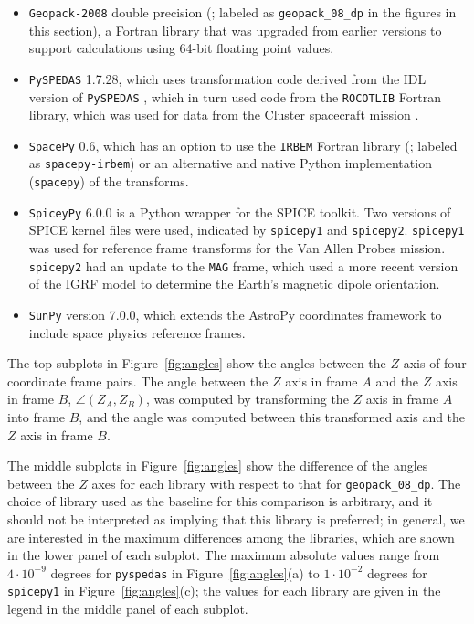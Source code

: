 \documentclass[draft]{agujournal2019}
\begin{document}
\begin{itemize}
    \item \texttt{Geopack-2008} double precision (; labeled as \texttt{geopack\_08\_dp} in the figures in this section), a Fortran library that was upgraded from earlier versions to support calculations using 64-bit floating point values.
    \item \texttt{PySPEDAS} 1.7.28, which uses transformation code derived from the IDL version of \texttt{PySPEDAS} \cite{Angelopoulos2024IDL}, which in turn used code from the \texttt{ROCOTLIB} Fortran \cite{ROCOTLIB} library, which was used for data from the Cluster spacecraft mission \cite{ClusterTools1993}.
    \item \texttt{SpacePy} 0.6, which has an option to use the \texttt{IRBEM} Fortran library (; labeled as \texttt{spacepy-irbem}) or an alternative and native Python implementation (\texttt{spacepy}) of the transforms.
    \item \texttt{SpiceyPy} 6.0.0 is a Python wrapper for the SPICE toolkit. Two versions of SPICE kernel files were used, indicated by \texttt{spicepy1} and \texttt{spicepy2}. \texttt{spicepy1} was used for reference frame transforms for the Van Allen Probes mission. \texttt{spicepy2} had an update to the \texttt{MAG} frame, which used a more recent version of the IGRF model \cite{Alken2021} to determine the Earth's magnetic dipole orientation.
    \item \texttt{SunPy} version 7.0.0, which extends the AstroPy coordinates framework to include space physics reference frames.
\end{itemize}

The top subplots in Figure~\ref{fig:angles} show the angles between the $Z$ axis of four coordinate frame pairs. The angle between the $Z$ axis in frame $A$ and the $Z$ axis in frame $B$, $\angle (Z_A, Z_B)$, was computed by transforming the $Z$ axis in frame $A$ into frame $B$, and the angle was computed between this transformed axis and the $Z$ axis in frame $B$. 

The middle subplots in Figure~\ref{fig:angles} show the difference of the angles between the $Z$ axes for each library with respect to that for \texttt{geopack\_08\_dp}. The choice of library used as the baseline for this comparison is arbitrary, and it should not be interpreted as implying that this library is preferred; in general, we are interested in the maximum differences among the libraries, which are shown in the lower panel of each subplot. The maximum absolute values range from $4\cdot 10^{-9}$ degrees for \texttt{pyspedas} in Figure~\ref{fig:angles}(a) to $1\cdot 10^{-2}$ degrees for \texttt{spicepy1} in Figure~\ref{fig:angles}(c); the values for each library are given in the legend in the middle panel of each subplot. %
\end{document}
